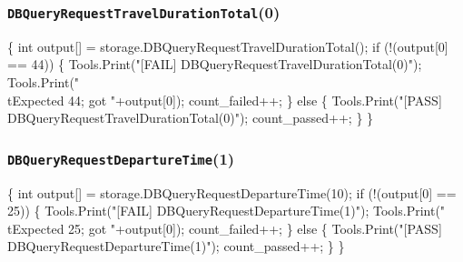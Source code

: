 \documentclass{article}
\def\nwendcode{\endtrivlist \endgroup}
\let\nwdocspar=\par
\begin{document}
\subsubsection{{\tt{}DBQueryRequestTravelDurationTotal}(0)}
\nwenddocs{}\endmoddef{}
\{
  int output[] = storage.DBQueryRequestTravelDurationTotal();
  if (!(output[0] == 44)) \{
    Tools.Print("[FAIL] DBQueryRequestTravelDurationTotal(0)");
    Tools.Print("\\tExpected 44; got "+output[0]);
    count_failed++;
  \} else \{
    Tools.Print("[PASS] DBQueryRequestTravelDurationTotal(0)");
    count_passed++;
  \}
\}
\nwendcode{}\nwdocspar
\subsubsection{{\tt{}DBQueryRequestDepartureTime}(1)}
\nwenddocs{}\endmoddef{}
\{
  int output[] = storage.DBQueryRequestDepartureTime(10);
  if (!(output[0] == 25)) \{
    Tools.Print("[FAIL] DBQueryRequestDepartureTime(1)");
    Tools.Print("\\tExpected 25; got "+output[0]);
    count_failed++;
  \} else \{
    Tools.Print("[PASS] DBQueryRequestDepartureTime(1)");
    count_passed++;
  \}
\}
\nwendcode{}\nwdocspar
\end{document}
